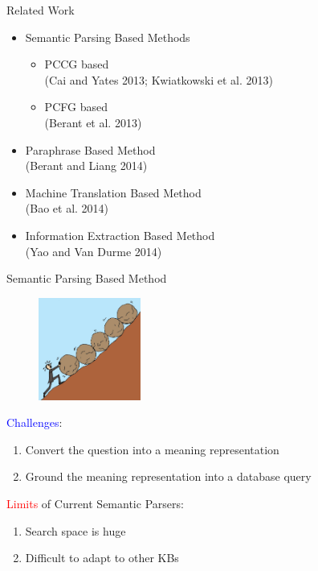 \documentclass{beamer}
\begin{document}
\begin{frame}{Related Work}
	\begin{itemize}
		\item Semantic Parsing Based Methods
			\begin{itemize}
				\item PCCG based \\ (Cai and Yates 2013; Kwiatkowski et al. 2013)
				\item PCFG based	\\ (Berant et al. 2013)
			\end{itemize}
		\item Paraphrase Based Method \\ (Berant and Liang 2014)
		\item Machine Translation Based Method \\ (Bao et al. 2014)
		\item Information Extraction Based Method \\ (Yao and Van Durme 2014)
	\end{itemize}
\end{frame}

\begin{frame}{Semantic Parsing Based Method}
\begin{figure}
		\centering\includegraphics[width=0.3\textwidth]{introduction/challenge.jpg}
\end{figure}
\textcolor{blue}{Challenges}:
\begin{enumerate}
		\item Convert the question into a meaning representation
		\item Ground the meaning representation into a database query
\end{enumerate}
\textcolor{red}{Limits} of Current Semantic Parsers:
\begin{enumerate}
	\item Search space is huge
	\item Difficult to adapt to other KBs
\end{enumerate}
\end{frame}
\end{document}
